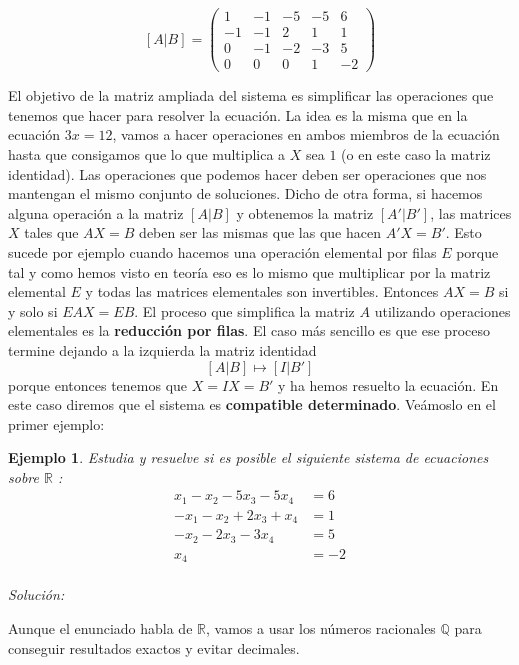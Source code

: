 \documentclass{amsart}
\newtheorem{ejem}{Ejemplo}
\def\r{\mathbb{R}}
\def\q{\mathbb{Q}}
\begin{document}
$$[A|B] = \left(\begin{array}{rrrr|r}
1 & -1 & -5 & -5 & 6 \\
-1 & -1 & 2 & 1 & 1 \\
0 & -1 & -2 & -3 & 5 \\
0 & 0 & 0 & 1 & -2
\end{array}\right)$$

El objetivo de la matriz ampliada del sistema es simplificar las operaciones 
que tenemos que hacer para resolver la ecuación. La idea es la misma que en la
ecuación $3x = 12$, vamos a hacer operaciones en ambos miembros de la ecuación
hasta que consigamos que lo que multiplica a $X$ sea $1$ (o en este caso la 
matriz identidad). Las operaciones que podemos hacer deben ser operaciones que
nos mantengan el mismo conjunto de soluciones. Dicho de otra forma, si hacemos
alguna operación a la matriz $[A|B]$ y obtenemos la matriz $[A'|B']$, las 
matrices $X$ tales que $AX = B$ deben ser las mismas que las que hacen $A'X = B'$.
Esto sucede por ejemplo cuando hacemos una operación elemental por filas $E$
porque tal y como hemos visto en teoría eso es lo mismo que multiplicar por
la matriz elemental $E$ y todas las matrices elementales son invertibles. 
Entonces $AX = B$ si y solo si $EAX = EB$. El proceso que simplifica la matriz
$A$ utilizando operaciones elementales es la {\bf reducción por filas}. El caso
más sencillo es que ese proceso termine dejando a la izquierda la matriz identidad
$$[A|B] \mapsto [I|B']$$
porque entonces tenemos que $X = IX = B'$ y ha hemos resuelto la ecuación. 
En este caso diremos que el sistema es {\bf compatible determinado}.
Veámoslo en el primer ejemplo:

\begin{ejem} Estudia y resuelve si es posible el siguiente sistema de ecuaciones 
sobre $\r $ :
\begin{align*}
x_{1} - x_{2} - 5 x_{3} - 5 x_{4} &= 6 \\
-x_{1} - x_{2} + 2 x_{3} + x_{4} &= 1 \\
-x_{2} - 2 x_{3} - 3 x_{4} &= 5 \\
x_{4} &= -2 \\
\end{align*}
\end{ejem}

{\it Solución:}

Aunque el enunciado habla de $\r$, vamos a usar los números racionales $\q$ 
para conseguir resultados exactos y evitar decimales. 
\end{document}
